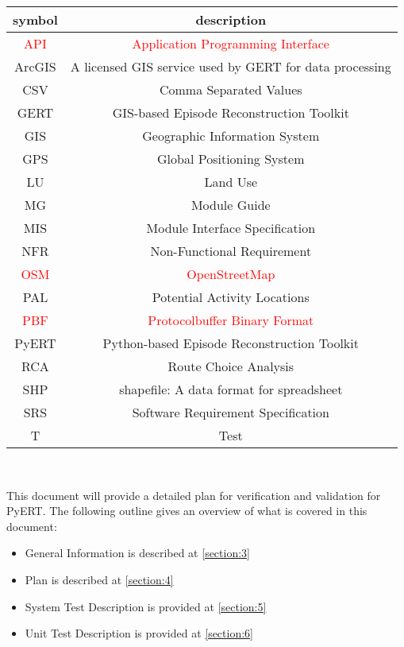 \documentclass[12pt, titlepage]{article}
\begin{document}
\renewcommand{\arraystretch}{1.2}
\begin{tabular}{|c|c|} 
  \hline		
  \textbf{symbol} & \textbf{description}\\
  \hline
  \textcolor{red}{API} & \textcolor{red}{Application Programming Interface} \\
  \hline
  ArcGIS & A licensed GIS service used by GERT for data processing \\
  \hline
  CSV & Comma Separated Values \\
  \hline
  GERT & GIS-based Episode Reconstruction Toolkit  \\ 
  \hline
  GIS & Geographic Information System \\
  \hline
  GPS & Global Positioning System \\
  \hline
  LU & Land Use \\ 
  \hline
  MG & Module Guide\\
  \hline
  MIS & Module Interface Specification\\
  \hline
  NFR & Non-Functional Requirement  \\
  \hline
  \textcolor{red}{OSM} & \textcolor{red}{OpenStreetMap}\\
  \hline
  PAL & Potential Activity Locations \\ 
  \hline
  \textcolor{red}{PBF} & \textcolor{red}{Protocolbuffer Binary Format} \\
  \hline
  PyERT & Python-based Episode Reconstruction Toolkit  \\ 
  \hline
  RCA & Route Choice Analysis \\
  \hline
  SHP & shapefile: A data format for spreadsheet \\
  \hline
  SRS & Software Requirement Specification\\
  \hline
  T & Test\\
  \hline
\end{tabular}\\

\newpage


This document will provide a detailed plan for verification and validation for PyERT. The following outline gives an overview of what is covered in this document:
\begin{itemize}
    \item General Information is described at \ref{section:3}
    \item Plan is described at \ref{section:4}
    \item System Test Description is provided at \ref{section:5}
    \item Unit Test Description is provided at \ref{section:6}
\end{itemize}
\end{document}
